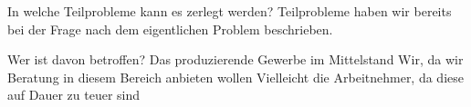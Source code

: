 In welche Teilprobleme kann es zerlegt werden?
Teilprobleme haben wir bereits bei der Frage nach dem eigentlichen Problem beschrieben.

Wer ist davon betroffen?
Das produzierende Gewerbe im Mittelstand
Wir, da wir Beratung in diesem Bereich anbieten wollen
Vielleicht die Arbeitnehmer, da diese auf Dauer zu teuer sind

